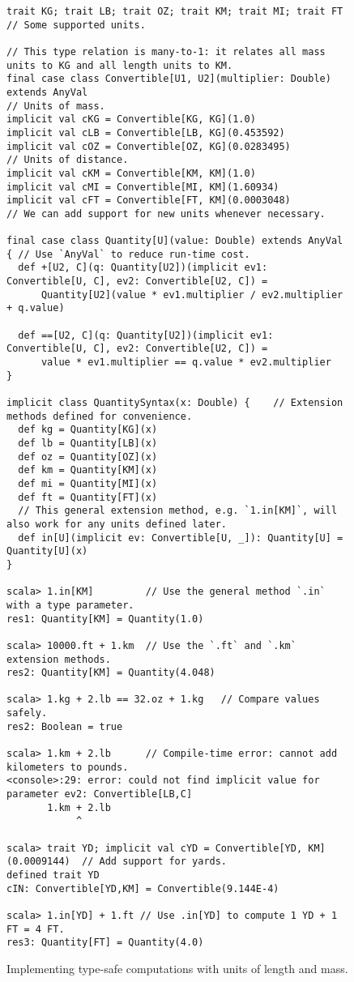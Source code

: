 \begin{figure}
\begin{lstlisting}[frame=single,fillcolor={\color{black}},framesep={0.2mm},framexleftmargin=2mm,framexrightmargin=2mm,framextopmargin=2mm,framexbottommargin=2mm]
trait KG; trait LB; trait OZ; trait KM; trait MI; trait FT             // Some supported units.

// This type relation is many-to-1: it relates all mass units to KG and all length units to KM.
final case class Convertible[U1, U2](multiplier: Double) extends AnyVal
// Units of mass.
implicit val cKG = Convertible[KG, KG](1.0)
implicit val cLB = Convertible[LB, KG](0.453592)
implicit val cOZ = Convertible[OZ, KG](0.0283495)
// Units of distance.
implicit val cKM = Convertible[KM, KM](1.0)
implicit val cMI = Convertible[MI, KM](1.60934)
implicit val cFT = Convertible[FT, KM](0.0003048)
// We can add support for new units whenever necessary.

final case class Quantity[U](value: Double) extends AnyVal { // Use `AnyVal` to reduce run-time cost.
  def +[U2, C](q: Quantity[U2])(implicit ev1: Convertible[U, C], ev2: Convertible[U2, C]) =
      Quantity[U2](value * ev1.multiplier / ev2.multiplier + q.value)

  def ==[U2, C](q: Quantity[U2])(implicit ev1: Convertible[U, C], ev2: Convertible[U2, C]) =
      value * ev1.multiplier == q.value * ev2.multiplier
}

implicit class QuantitySyntax(x: Double) {    // Extension methods defined for convenience.
  def kg = Quantity[KG](x)
  def lb = Quantity[LB](x)
  def oz = Quantity[OZ](x)
  def km = Quantity[KM](x)
  def mi = Quantity[MI](x)
  def ft = Quantity[FT](x)
  // This general extension method, e.g. `1.in[KM]`, will also work for any units defined later.
  def in[U](implicit ev: Convertible[U, _]): Quantity[U] = Quantity[U](x)
}

scala> 1.in[KM]         // Use the general method `.in` with a type parameter.
res1: Quantity[KM] = Quantity(1.0)

scala> 10000.ft + 1.km  // Use the `.ft` and `.km` extension methods.
res2: Quantity[KM] = Quantity(4.048)

scala> 1.kg + 2.lb == 32.oz + 1.kg   // Compare values safely.
res2: Boolean = true

scala> 1.km + 2.lb      // Compile-time error: cannot add kilometers to pounds.
<console>:29: error: could not find implicit value for parameter ev2: Convertible[LB,C]
       1.km + 2.lb
            ^

scala> trait YD; implicit val cYD = Convertible[YD, KM](0.0009144)  // Add support for yards.
defined trait YD
cIN: Convertible[YD,KM] = Convertible(9.144E-4)

scala> 1.in[YD] + 1.ft // Use .in[YD] to compute 1 YD + 1 FT = 4 FT.
res3: Quantity[FT] = Quantity(4.0)
\end{lstlisting}

\caption{Implementing type-safe computations with units of length and mass.\label{fig:Full-code-implementing-units-length-mass}}
\end{figure}



